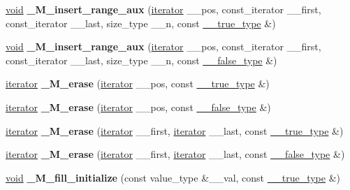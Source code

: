 \begin{DoxyCompactItemize}
\hyperlink{interfacevoid}{void} {\bfseries \+\_\+\+M\+\_\+insert\+\_\+range\+\_\+aux} (\hyperlink{structiterator}{iterator} \+\_\+\+\_\+pos, const\+\_\+iterator \+\_\+\+\_\+first, const\+\_\+iterator \+\_\+\+\_\+last, size\+\_\+type \+\_\+\+\_\+n, const \hyperlink{struct____true__type}{\+\_\+\+\_\+true\+\_\+type} \&)
\item 
\mbox{\label{classdeque_ae929a1d70103425a4fd7e4b6fc428a5d}} 
\hyperlink{interfacevoid}{void} {\bfseries \+\_\+\+M\+\_\+insert\+\_\+range\+\_\+aux} (\hyperlink{structiterator}{iterator} \+\_\+\+\_\+pos, const\+\_\+iterator \+\_\+\+\_\+first, const\+\_\+iterator \+\_\+\+\_\+last, size\+\_\+type \+\_\+\+\_\+n, const \hyperlink{struct____false__type}{\+\_\+\+\_\+false\+\_\+type} \&)
\item 
\mbox{\label{classdeque_a9ba3e3698721556a0aa604a76fd13965}} 
\hyperlink{structiterator}{iterator} {\bfseries \+\_\+\+M\+\_\+erase} (\hyperlink{structiterator}{iterator} \+\_\+\+\_\+pos, const \hyperlink{struct____true__type}{\+\_\+\+\_\+true\+\_\+type} \&)
\item 
\mbox{\label{classdeque_a6fe5c189757b22ddef6d11691d38212a}} 
\hyperlink{structiterator}{iterator} {\bfseries \+\_\+\+M\+\_\+erase} (\hyperlink{structiterator}{iterator} \+\_\+\+\_\+pos, const \hyperlink{struct____false__type}{\+\_\+\+\_\+false\+\_\+type} \&)
\item 
\mbox{\label{classdeque_ad8a3c5c28467c3af3453016e916228b8}} 
\hyperlink{structiterator}{iterator} {\bfseries \+\_\+\+M\+\_\+erase} (\hyperlink{structiterator}{iterator} \+\_\+\+\_\+first, \hyperlink{structiterator}{iterator} \+\_\+\+\_\+last, const \hyperlink{struct____true__type}{\+\_\+\+\_\+true\+\_\+type} \&)
\item 
\mbox{\label{classdeque_a3dc66c596c6f37d0615f011bb15bfd13}} 
\hyperlink{structiterator}{iterator} {\bfseries \+\_\+\+M\+\_\+erase} (\hyperlink{structiterator}{iterator} \+\_\+\+\_\+first, \hyperlink{structiterator}{iterator} \+\_\+\+\_\+last, const \hyperlink{struct____false__type}{\+\_\+\+\_\+false\+\_\+type} \&)
\item 
\mbox{\label{classdeque_ab3a4399f02dfaf305b7d80bfd839912a}} 
\hyperlink{interfacevoid}{void} {\bfseries \+\_\+\+M\+\_\+fill\+\_\+initialize} (const value\+\_\+type \&\+\_\+\+\_\+val, const \hyperlink{struct____true__type}{\+\_\+\+\_\+true\+\_\+type} \&)

\end{DoxyCompactItemize}
